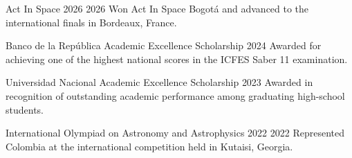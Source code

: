 \cvsection{\AwardsLabel}

\cvaward
{Act In Space 2026}
{2026}
{Won Act In Space Bogotá and advanced to the international finals in Bordeaux, France.}

\cvaward
{Banco de la República Academic Excellence Scholarship}
{2024}
{Awarded for achieving one of the highest national scores in the ICFES Saber 11 examination.}

\cvaward
{Universidad Nacional Academic Excellence Scholarship}
{2023}
{Awarded in recognition of outstanding academic performance among graduating high-school students.}

\cvaward
{International Olympiad on Astronomy and Astrophysics 2022}
{2022}
{Represented Colombia at the international competition held in Kutaisi, Georgia.}